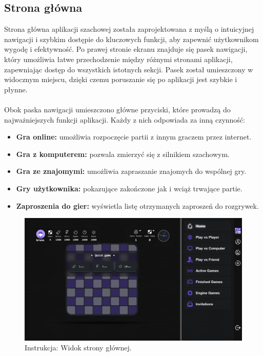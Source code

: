 \documentclass[twoside]{projektInzynierskiMS1}
\begin{document}
\newpage

\subsection{Strona główna}

\noindent
Strona główna aplikacji szachowej została zaprojektowana z myślą o intuicyjnej nawigacji i szybkim dostępie do kluczowych funkcji, aby zapewnić użytkownikom wygodę i efektywność. Po prawej stronie ekranu znajduje się pasek nawigacji, który umożliwia łatwe przechodzenie między różnymi stronami aplikacji, zapewniając dostęp do wszystkich istotnych sekcji. Pasek został umieszczony w widocznym miejscu, dzięki czemu poruszanie się po aplikacji jest szybkie i płynne.
\\\\
Obok paska nawigacji umieszczono główne przyciski, które prowadzą do najważniejszych funkcji aplikacji. Każdy z nich odpowiada za inną czynność:

\begin{itemize}
    \item \textbf{Gra online:} umożliwia rozpoczęcie partii z innym graczem przez internet.
    \item \textbf{Gra z komputerem:} pozwala zmierzyć się z silnikiem szachowym.
    \item \textbf{Gra ze znajomymi:} umożliwia zapraszanie znajomych do wspólnej gry.
    \item \textbf{Gry użytkownika:} pokazujące zakończone jak i wciąż trwające partie.
    \item \textbf{Zaproszenia do gier:} wyświetla listę otrzymanych zaproszeń do rozgrywek.
\end{itemize}

\vspace{0.5cm}
\begin{figure}[h!]
    \centering
    \includegraphics[width=1\textwidth]{images/ins_main.png}
    \caption{Instrukcja: Widok strony głównej.}
\end{figure}
\end{document}
